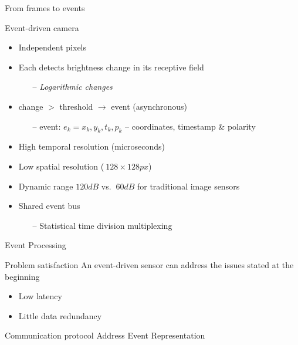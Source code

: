 \documentclass[11pt,center]{beamer}
\begin{document}
	\begin{frame}{From frames to events}
		\begin{block}{Event-driven camera}
			\begin{itemize}
				\item Independent pixels
				\item Each detects brightness change in its receptive field
				\begin{itemize}
					\item[--] \em{Logarithmic} changes
				\end{itemize}
				\item change $>$ threshold $\rightarrow$ event (asynchronous)
				\begin{itemize}
					\item[--] event: $e_k = {x_k,y_k,t_k,p_k}$ -- coordinates, timestamp \& polarity
				\end{itemize}
				\pause
				\item High temporal resolution (microseconds)
				\item Low spatial resolution ($~128\times 128 px$)
				\item Dynamic range $120dB$ vs. $~60dB$ for traditional image sensors
				\item Shared event bus
				\begin{itemize}
					\item[--] Statistical time division multiplexing
				\end{itemize}
			\end{itemize}

			\pause
			\centering
		\end{block}

	\end{frame}

	\begin{frame}{Event Processing}
		\begin{block}{Problem satisfaction}
			An event-driven sensor can address the issues stated at the beginning
			\begin{itemize}
				\item Low latency
				\item Little data redundancy
			\end{itemize}
		\end{block}

		\pause
		\begin{block}{Communication protocol}
		  Address Event Representation
		\end{block}

		\vskip10pt
	\end{frame}
\end{document}
